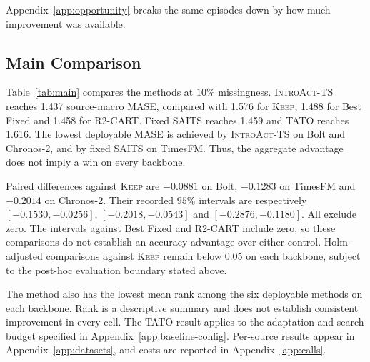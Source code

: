 \documentclass{article}
\newcommand{\introact}{\textsc{IntroAct-TS}}
\begin{document}
Appendix~\ref{app:opportunity} breaks the same episodes down by how much improvement was
available.

\subsection{Main Comparison}
\label{sec:exp-main}
Table~\ref{tab:main} compares the methods at $10\%$ missingness.
\introact{} reaches 1.437 source-macro MASE, compared with 1.576 for \textsc{Keep}, 1.488
for Best Fixed and 1.458 for R2-CART. Fixed SAITS reaches 1.459 and TATO reaches 1.616.
The lowest deployable MASE is achieved by \introact{} on Bolt and Chronos-2, and by fixed
SAITS on TimesFM. Thus, the aggregate advantage does not imply a win on every backbone.

Paired differences against \textsc{Keep} are $-0.0881$ on Bolt, $-0.1283$ on TimesFM and
$-0.2014$ on Chronos-2. Their recorded $95\%$ intervals are respectively
$[-0.1530,-0.0256]$, $[-0.2018,-0.0543]$ and $[-0.2876,-0.1180]$.
All exclude zero. The intervals against Best Fixed and R2-CART include zero, so these
comparisons do not establish an accuracy advantage over either control. Holm-adjusted
comparisons against \textsc{Keep} remain below $0.05$ on each backbone, subject to the
post-hoc evaluation boundary stated above.

The method also has the lowest mean rank among the six deployable methods on each backbone.
Rank is a descriptive summary and does not establish consistent improvement in every cell.
The TATO result applies to the adaptation and search budget specified in
Appendix~\ref{app:baseline-config}. Per-source results appear in Appendix~\ref{app:datasets},
and costs are reported in Appendix~\ref{app:calls}.
\end{document}
